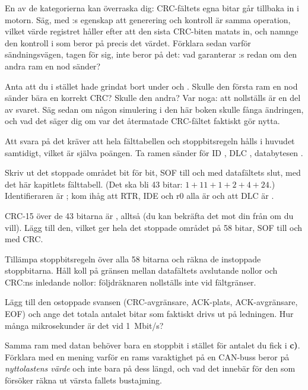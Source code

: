  En av de kategorierna kan överraska dig: CRC-fältets egna bitar går tillbaka in i motorn.
Säg, med :s egenskap att generering och kontroll är samma operation, vilket värde
registret håller efter att den sista CRC-biten matats in, och namnge den kontroll i 
som beror på precis det värdet. Förklara sedan varför sändningsvägen, tagen för sig, inte beror på
det: vad garanterar :s  redan om den andra ram en nod sänder?

 Anta att du i stället hade grindat bort  under  och
. Skulle den första ram en nod sänder bära en korrekt CRC? Skulle den andra? Var
noga: att  nollställs är en del av svaret. Säg sedan om någon simulering i den här boken
skulle fånga ändringen, och vad det säger dig om var det återmatade CRC-fältet faktiskt gör nytta.

\label{c16:ex:framelen}
Att svara på det kräver att hela fälttabellen och stoppbitsregeln hålls i huvudet samtidigt, vilket är
själva poängen. Ta ramen  sänder för ID , DLC , databytesen
.

 Skriv ut det stoppade området bit för bit, SOF till och med datafältets slut, med det här
kapitlets fälttabell. (Det ska bli 43 bitar: $1 + 11 + 1 + 2 + 4 + 24$.) Identifieraren är
; kom ihåg att RTR, IDE och r0 alla är  och att DLC är .

 CRC-15 över de 43 bitarna är , alltså  (du kan bekräfta
det mot din  från  om du vill). Lägg till den, vilket ger hela det
stoppade området på 58 bitar, SOF till och med CRC.

 Tillämpa stoppbitsregeln över alla 58 bitarna och räkna de instoppade stoppbitarna. Håll
koll på gränsen mellan datafältets avslutande nollor och CRC:ns inledande nollor: följdräknaren
nollställs inte vid fältgränser.

 Lägg till den ostoppade svansen (CRC-avgränsare, ACK-plats, ACK-avgränsare, EOF) och ange
det totala antalet bitar som faktiskt drivs ut på ledningen. Hur många mikrosekunder är det vid
1~Mbit/s?

 Samma ram med datan  behöver bara en stoppbit i stället för antalet du fick
i \textbf{c)}. Förklara med en mening varför en rams varaktighet på en CAN-buss beror på
\emph{nyttolastens värde} och inte bara på dess längd, och vad det innebär för den som försöker räkna
ut värsta fallets bustajming.
